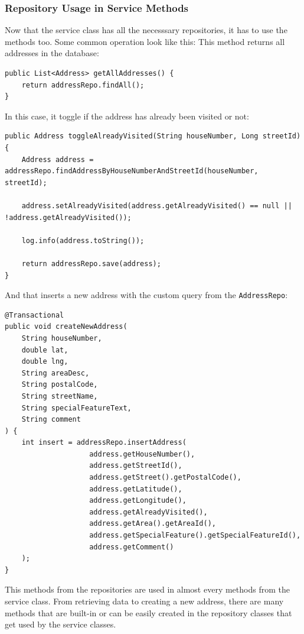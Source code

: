     \subsubsection{Repository Usage in Service Methods}
    Now that the service class has all the necesssary repositories, it has to use the methods too. Some common operation look like this: \newline
    This method returns all addresses in the database: 
    \lstset{style=mycsharp, caption=Fetching all Addresses}
    \begin{lstlisting}
public List<Address> getAllAddresses() {
    return addressRepo.findAll();
}
    \end{lstlisting}

    In this case, it toggle if the address has already been visited or not:
    \lstset{style=mycsharp, caption=Toggle Already Visited}
    \begin{lstlisting}
public Address toggleAlreadyVisited(String houseNumber, Long streetId) {
    Address address = addressRepo.findAddressByHouseNumberAndStreetId(houseNumber, streetId);
    
    address.setAlreadyVisited(address.getAlreadyVisited() == null || !address.getAlreadyVisited());
    
    log.info(address.toString());
    
    return addressRepo.save(address);
}
    \end{lstlisting}

    And that inserts a new address with the custom query from the \texttt{AddressRepo}: 
    \lstset{style=mycsharp, caption=Insert new Address}
    \begin{lstlisting}
@Transactional
public void createNewAddress(
    String houseNumber,
    double lat,
    double lng,
    String areaDesc,
    String postalCode,
    String streetName,
    String specialFeatureText,
    String comment
) {
    int insert = addressRepo.insertAddress(
                    address.getHouseNumber(),
                    address.getStreetId(),
                    address.getStreet().getPostalCode(),
                    address.getLatitude(),
                    address.getLongitude(),
                    address.getAlreadyVisited(),
                    address.getArea().getAreaId(),
                    address.getSpecialFeature().getSpecialFeatureId(),
                    address.getComment()
    );
}    
    \end{lstlisting}

    This methods from the repositories are used in almost every methods from the service class. From retrieving data to creating a new address, there are many methods that are built-in or can be easily created in the repository classes that get used by the service classes.

